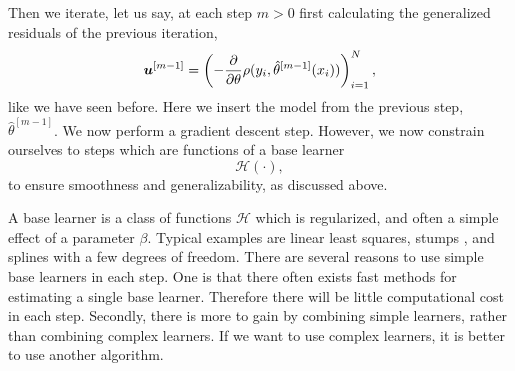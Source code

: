 Then we iterate, let us say, at each step $m>0$ first calculating the generalized residuals of the previous iteration,
\begin{equation*}
    \bm{u}^{[m-1]}=\left(-\frac{\partial}{\partial \theta}\rho(y_i, \hat{\theta}^{[m-1]}(x_i))\right)_{i=1}^N,
\end{equation*}
like we have seen before.
Here we insert the model from the previous step, $\hat{\theta}^{[m-1]}$.
We now perform a gradient descent step.
However, we now constrain ourselves to steps which are functions of a base learner
\begin{equation*}
    \mathcal{H}(\cdot),
\end{equation*}
to ensure smoothness and generalizability, as discussed above.

A base learner is a class of functions $\mathcal{H}$ which is regularized, and often a simple effect of a parameter $\beta$.
Typical examples are linear least squares, stumps \citep[trees with one split, see][]{buhlmann2007,ESL}, and splines with a few degrees of freedom.
There are several reasons to use simple base learners in each step.
One is that there often exists fast methods for estimating a single base learner.
Therefore there will be little computational cost in each step. 
Secondly, there is more to gain by combining simple learners, rather than combining complex learners.
If we want to use complex learners, it is better to use another algorithm.

